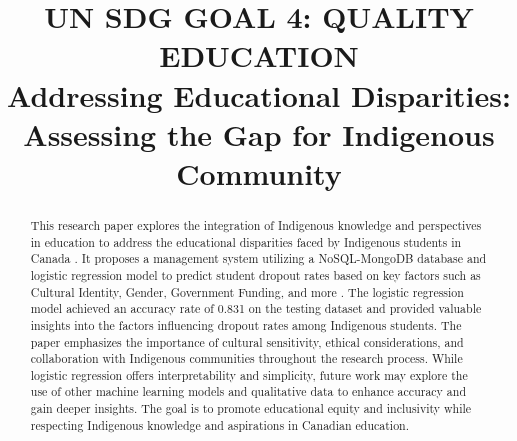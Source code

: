 \documentclass[conference]{IEEEtran}
\begin{document}
\title{UN SDG GOAL 4: QUALITY EDUCATION\\Addressing Educational Disparities: Assessing the Gap for Indigenous Community}\\


\author{
\and
{}
\and
{}
\and
{}
\and
{}
}


\maketitle

\begin{abstract}
This research paper explores the integration of Indigenous knowledge and perspectives in education to address the educational disparities faced by Indigenous students in Canada \cite{r1}. It proposes a management system utilizing a NoSQL-MongoDB database and logistic regression model to predict student dropout rates based on key factors such as Cultural Identity, Gender, Government Funding, and more \cite{r2}. The logistic regression model achieved an accuracy rate of 0.831 on the testing dataset and provided valuable insights into the factors influencing dropout rates among Indigenous students. The paper emphasizes the importance of cultural sensitivity, ethical considerations, and collaboration with Indigenous communities throughout the research process. While logistic regression offers interpretability and simplicity, future work may explore the use of other machine learning models and qualitative data to enhance accuracy and gain deeper insights. The goal is to promote educational equity and inclusivity while respecting Indigenous knowledge and aspirations in Canadian education.
\end{abstract}
\end{document}
